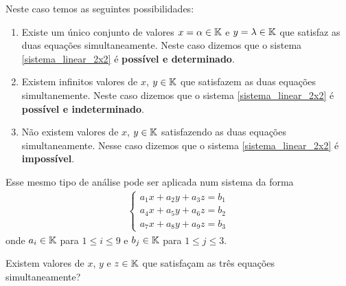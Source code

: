 \documentclass{beamer}
\begin{document}
    \begin{frame}
        Neste caso temos as seguintes possibilidades:\pause
        \begin{enumerate}[label={\roman*})]
            \item Existe um único conjunto de valores $x = \alpha \in \mathbb{K}$ e $y = \lambda \in \mathbb{K}$ \pause que satisfaz as duas equações simultaneamente. \pause Neste caso dizemos que o sistema \eqref{sistema_linear_2x2} \pause é \textbf{possível e determinado}.\pause

            \item Existem infinitos valores de $x$, $y \in \mathbb{K}$ \pause que satisfazem as duas equações simultanemente. \pause Neste caso dizemos que o sistema \eqref{sistema_linear_2x2} \pause é \textbf{possível e indeterminado}.\pause

            \item Não existem valores de $x$, $y \in \mathbb{K}$ \pause satisfazendo as duas equações simultaneamente. \pause Nesse caso dizemos que o sistema \eqref{sistema_linear_2x2} \pause é \textbf{impossível}.
        \end{enumerate}
    \end{frame}
    
    \begin{frame}
        Esse mesmo tipo de análise pode ser aplicada num sistema da forma
        \begin{align}
            \begin{cases}\label{sistema_linear_3x3}
                a_1x + a_2y + a_3z = b_1\\
                a_4x + a_5y + a_6z = b_2\\
                a_7x + a_8y + a_9z = b_3
            \end{cases}
        \end{align}
        onde $a_i \in \mathbb{K}$ para $1 \le i \le 9$ e $b_j \in \mathbb{K}$ para $1 \le j \le 3$.\pause

        \vspace{.3cm}

        Existem valores de $x$, $y$ e $z \in \mathbb{K}$ que satisfaçam as três equações simultaneamente?
    \end{frame}
    
\end{document}

